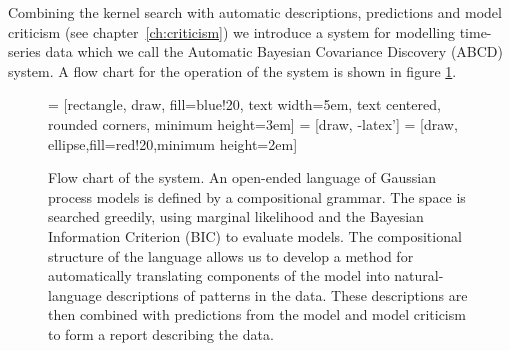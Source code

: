 Combining the kernel search with automatic descriptions, predictions and model criticism (see chapter~\ref{ch:criticism}) we introduce a system for modelling time-series data which we call the Automatic Bayesian Covariance Discovery (ABCD) system.
A flow chart for the operation of the system is shown in figure \ref{fig:description:flow}.

\begin{figure}[ht]
  \centering
   = [rectangle, draw, fill=blue!20, 
                       text width=5em, text centered, rounded corners, minimum height=3em]
   = [draw, -latex']
   = [draw, ellipse,fill=red!20,minimum height=2em]
    
  \caption[Flow chart of the \procedurename{} system.]{Flow chart of the \procedurename{} system.
  An open-ended language of Gaussian process models is defined by a compositional grammar.
  The space is searched greedily, using marginal likelihood and the Bayesian Information Criterion (BIC) to evaluate models.
  The  compositional structure of the language allows us to develop a method for automatically translating components of the model into natural-language descriptions of patterns in the data.
  These descriptions are then combined with predictions from the model and model criticism to form a report describing the data.}
  \label{fig:description:flow}
\end{figure}

